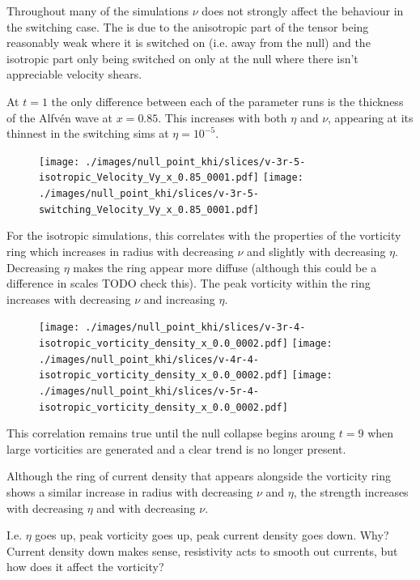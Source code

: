 Throughout many of the simulations $\nu$ does not strongly affect the behaviour in the switching case. The is due to the anisotropic part of the tensor being reasonably weak where it is switched on (i.e. away from the null) and the isotropic part only being switched on only at the null where there isn't appreciable velocity shears.

At $t=1$ the only difference between each of the parameter runs is the thickness of the Alfv\'en wave at $x=0.85$. This increases with both $\eta$ and $\nu$, appearing at its thinnest in the switching sims at $\eta=10^{-5}$.

\begin{figure}[H]
  \centering
  \texttt{[image: ./images/null\_point\_khi/slices/v-3r-5-isotropic\_Velocity\_Vy\_x\_0.85\_0001.pdf]}
  \texttt{[image: ./images/null\_point\_khi/slices/v-3r-5-switching\_Velocity\_Vy\_x\_0.85\_0001.pdf]}
\end{figure}

For the isotropic simulations, this correlates with the properties of the vorticity ring which increases in radius with decreasing $\nu$ and slightly with decreasing $\eta$. Decreasing $\eta$ makes the ring appear more diffuse (although this could be a difference in scales TODO check this). The peak vorticity within the ring increases with decreasing $\nu$ and increasing $\eta$.

\begin{figure}[H]
  \centering
  \texttt{[image: ./images/null\_point\_khi/slices/v-3r-4-isotropic\_vorticity\_density\_x\_0.0\_0002.pdf]}
  \texttt{[image: ./images/null\_point\_khi/slices/v-4r-4-isotropic\_vorticity\_density\_x\_0.0\_0002.pdf]}
  \texttt{[image: ./images/null\_point\_khi/slices/v-5r-4-isotropic\_vorticity\_density\_x\_0.0\_0002.pdf]}
\end{figure}

This correlation remains true until the null collapse begins aroung $t=9$ when large vorticities are generated and a clear trend is no longer present.

Although the ring of current density that appears alongside the vorticity ring shows a similar increase in radius with decreasing $\nu$ and $\eta$, the strength increases with decreasing $\eta$ and with decreasing $\nu$.

I.e. $\eta$ goes up, peak vorticity goes up, peak current density goes down. Why? Current density down makes sense, resistivity acts to smooth out currents, but how does it affect the vorticity?

